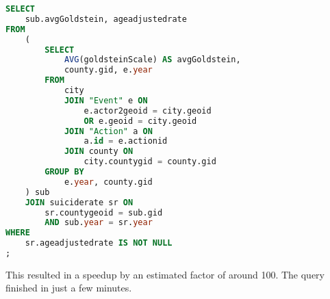 \begin{lstlisting}[language=SQL]
SELECT
    sub.avgGoldstein, ageadjustedrate
FROM
    (
        SELECT
            AVG(goldsteinScale) AS avgGoldstein,
            county.gid, e.year
        FROM
            city
            JOIN "Event" e ON 
                e.actor2geoid = city.geoid 
                OR e.geoid = city.geoid
            JOIN "Action" a ON 
                a.id = e.actionid
            JOIN county ON
                city.countygid = county.gid
        GROUP BY             
            e.year, county.gid
    ) sub
    JOIN suiciderate sr ON 
        sr.countygeoid = sub.gid
        AND sub.year = sr.year
WHERE
    sr.ageadjustedrate IS NOT NULL
;
\end{lstlisting}

This resulted in a speedup by an estimated factor of around 100.
The query finished in just a few minutes.